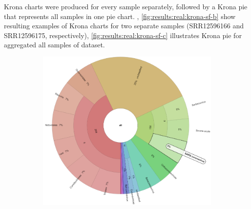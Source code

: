     Krona charts were produced for every sample separately, followed by a Krona pie that represents all samples in one pie chart. , \ref{fig:results:real:krona-sf-b} show resulting examples of Krona charts for two separate samples (SRR12596166 and SRR12596175, respectively), \cref{fig:results:real:krona-sf-c} illustrates Krona pie for aggregated all samples of dataset. 
    
    \begin{figure}[H]
        \centering
        \begin{subfigure}[b]{0.45\textwidth}
        \includegraphics[width=1\textwidth]{figures/results/real/krona/krona-sf-sSRR12596166.png}
        \label{fig:results:real:krona-sf-a}
        \end{subfigure}
        \hfill
        \begin{subfigure}[b]{0.43\textwidth}

\end{subfigure}
\end{figure}
